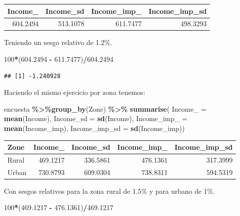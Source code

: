 \documentclass[
  12pt,
]{book}
\newenvironment{Shaded}{\begin{snugshade}}{\end{snugshade}}
\newcommand{\AttributeTok}[1]{\textcolor[rgb]{0.13,0.29,0.53}{#1}}
\newcommand{\DecValTok}[1]{\textcolor[rgb]{0.00,0.00,0.81}{#1}}
\newcommand{\FloatTok}[1]{\textcolor[rgb]{0.00,0.00,0.81}{#1}}
\newcommand{\FunctionTok}[1]{\textcolor[rgb]{0.13,0.29,0.53}{\textbf{#1}}}
\newcommand{\NormalTok}[1]{#1}
\newcommand{\SpecialCharTok}[1]{\textcolor[rgb]{0.81,0.36,0.00}{\textbf{#1}}}
\begin{document}
\begin{tabular}{r|r|r|r}
\hline
Income\_ & Income\_sd & Income\_imp\_ & Income\_imp\_sd\\
\hline
604.2494 & 513.1078 & 611.7477 & 498.3293\\
\hline
\end{tabular}

Teniendo un sesgo relativo de 1.2\%.

\begin{Shaded}
\begin{Highlighting}[]
\DecValTok{100}\SpecialCharTok{*}\NormalTok{(}\FloatTok{604.2494} \SpecialCharTok{{-}} \FloatTok{611.7477}\NormalTok{)}\SpecialCharTok{/}\FloatTok{604.2494}
\end{Highlighting}
\end{Shaded}

\begin{verbatim}
## [1] -1.240928
\end{verbatim}

Haciendo el mismo ejercicio por zona tenemos:

\begin{Shaded}
\begin{Highlighting}[]
\NormalTok{encuesta }\SpecialCharTok{\%\textgreater{}\%}\FunctionTok{group\_by}\NormalTok{(Zone) }\SpecialCharTok{\%\textgreater{}\%}  \FunctionTok{summarise}\NormalTok{(}
  \AttributeTok{Income\_ =} \FunctionTok{mean}\NormalTok{(Income),}
  \AttributeTok{Income\_sd =} \FunctionTok{sd}\NormalTok{(Income),}
  \AttributeTok{Income\_imp\_ =} \FunctionTok{mean}\NormalTok{(Income\_imp),}
  \AttributeTok{Income\_imp\_sd =} \FunctionTok{sd}\NormalTok{(Income\_imp))}
\end{Highlighting}
\end{Shaded}

\begin{tabular}{l|r|r|r|r}
\hline
Zone & Income\_ & Income\_sd & Income\_imp\_ & Income\_imp\_sd\\
\hline
Rural & 469.1217 & 336.5861 & 476.1361 & 317.3999\\
\hline
Urban & 730.8793 & 609.0304 & 738.8311 & 594.5319\\
\hline
\end{tabular}

Con sesgos relativos para la zona rural de 1.5\% y para urbano de 1\%.

\begin{Shaded}
\begin{Highlighting}[]
\DecValTok{100}\SpecialCharTok{*}\NormalTok{(}\FloatTok{469.1217} \SpecialCharTok{{-}} \FloatTok{476.1361}\NormalTok{)}\SpecialCharTok{/}\FloatTok{469.1217}
\end{Highlighting}
\end{Shaded}
\end{document}
